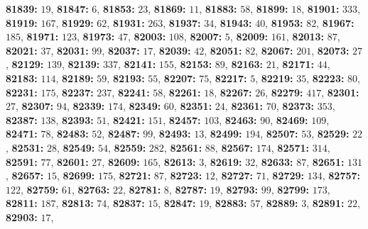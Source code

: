 \textsf{\bfseries 81839:} $19$, \textsf{\bfseries 81847:} $6$, \textsf{\bfseries 81853:} $23$, \textsf{\bfseries 81869:} $11$, \textsf{\bfseries 81883:} $58$, \textsf{\bfseries 81899:} $18$, \textsf{\bfseries 81901:} $333$, \textsf{\bfseries 81919:} $167$, \textsf{\bfseries 81929:} $62$, \textsf{\bfseries 81931:} $263$, \textsf{\bfseries 81937:} $34$, \textsf{\bfseries 81943:} $40$, \textsf{\bfseries 81953:} $82$, \textsf{\bfseries 81967:} $185$, \textsf{\bfseries 81971:} $123$, \textsf{\bfseries 81973:} $47$, \textsf{\bfseries 82003:} $108$, \textsf{\bfseries 82007:} $5$, \textsf{\bfseries 82009:} $161$, \textsf{\bfseries 82013:} $87$, \textsf{\bfseries 82021:} $37$, \textsf{\bfseries 82031:} $99$, \textsf{\bfseries 82037:} $17$, \textsf{\bfseries 82039:} $42$, \textsf{\bfseries 82051:} $82$, \textsf{\bfseries 82067:} $201$, \textsf{\bfseries 82073:} $27$, \textsf{\bfseries 82129:} $139$, \textsf{\bfseries 82139:} $337$, \textsf{\bfseries 82141:} $155$, \textsf{\bfseries 82153:} $89$, \textsf{\bfseries 82163:} $21$, \textsf{\bfseries 82171:} $44$, \textsf{\bfseries 82183:} $114$, \textsf{\bfseries 82189:} $59$, \textsf{\bfseries 82193:} $55$, \textsf{\bfseries 82207:} $75$, \textsf{\bfseries 82217:} $5$, \textsf{\bfseries 82219:} $35$, \textsf{\bfseries 82223:} $80$, \textsf{\bfseries 82231:} $175$, \textsf{\bfseries 82237:} $237$, \textsf{\bfseries 82241:} $58$, \textsf{\bfseries 82261:} $18$, \textsf{\bfseries 82267:} $26$, \textsf{\bfseries 82279:} $417$, \textsf{\bfseries 82301:} $27$, \textsf{\bfseries 82307:} $94$, \textsf{\bfseries 82339:} $174$, \textsf{\bfseries 82349:} $60$, \textsf{\bfseries 82351:} $24$, \textsf{\bfseries 82361:} $70$, \textsf{\bfseries 82373:} $353$, \textsf{\bfseries 82387:} $138$, \textsf{\bfseries 82393:} $51$, \textsf{\bfseries 82421:} $151$, \textsf{\bfseries 82457:} $103$, \textsf{\bfseries 82463:} $90$, \textsf{\bfseries 82469:} $109$, \textsf{\bfseries 82471:} $78$, \textsf{\bfseries 82483:} $52$, \textsf{\bfseries 82487:} $99$, \textsf{\bfseries 82493:} $13$, \textsf{\bfseries 82499:} $194$, \textsf{\bfseries 82507:} $53$, \textsf{\bfseries 82529:} $22$, \textsf{\bfseries 82531:} $28$, \textsf{\bfseries 82549:} $54$, \textsf{\bfseries 82559:} $282$, \textsf{\bfseries 82561:} $88$, \textsf{\bfseries 82567:} $174$, \textsf{\bfseries 82571:} $314$, \textsf{\bfseries 82591:} $77$, \textsf{\bfseries 82601:} $27$, \textsf{\bfseries 82609:} $165$, \textsf{\bfseries 82613:} $3$, \textsf{\bfseries 82619:} $32$, \textsf{\bfseries 82633:} $87$, \textsf{\bfseries 82651:} $131$, \textsf{\bfseries 82657:} $15$, \textsf{\bfseries 82699:} $175$, \textsf{\bfseries 82721:} $87$, \textsf{\bfseries 82723:} $12$, \textsf{\bfseries 82727:} $71$, \textsf{\bfseries 82729:} $134$, \textsf{\bfseries 82757:} $122$, \textsf{\bfseries 82759:} $61$, \textsf{\bfseries 82763:} $22$, \textsf{\bfseries 82781:} $8$, \textsf{\bfseries 82787:} $19$, \textsf{\bfseries 82793:} $99$, \textsf{\bfseries 82799:} $173$, \textsf{\bfseries 82811:} $187$, \textsf{\bfseries 82813:} $74$, \textsf{\bfseries 82837:} $15$, \textsf{\bfseries 82847:} $19$, \textsf{\bfseries 82883:} $57$, \textsf{\bfseries 82889:} $3$, \textsf{\bfseries 82891:} $22$, \textsf{\bfseries 82903:} $17$, 
